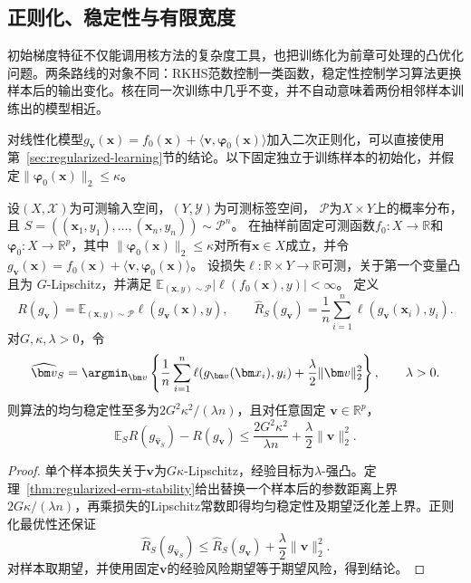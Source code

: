 \subsection{正则化、稳定性与有限宽度}

初始梯度特征不仅能调用核方法的复杂度工具，也把训练化为前章可处理的凸优化问题。两条路线的对象不同：RKHS范数控制一类函数，稳定性控制学习算法更换样本后的输出变化。核在同一次训练中几乎不变，并不自动意味着两份相邻样本训练出的模型相近。

对线性化模型$g_{\bm v}(\bm x)=f_0(\bm x)+\langle\bm v,\bm\varphi_0(\bm x)\rangle$加入二次正则化，可以直接使用第~\ref{sec:regularized-learning}节的结论。以下固定独立于训练样本的初始化，并假定$\|\bm\varphi_0(\bm x)\|_2\leq\kappa$。

\begin{theorem}[正则化固定特征模型的稳定性]
\label{thm:ntk-stability-risk}
设$(X,\mathcal X)$为可测输入空间，$(Y,\mathcal Y)$为可测标签空间，
$\mathcal P$为$X\times Y$上的概率分布，且
$S=((\bm x_1,y_1),\ldots,(\bm x_n,y_n))\sim\mathcal P^n$。
在抽样前固定可测函数$f_0:X\to\mathbb R$和
$\bm\varphi_0:X\to\mathbb R^p$，其中
$\|\bm\varphi_0(\bm x)\|_2\leq\kappa$对所有$\bm x\in X$成立，并令
$g_{\bm v}(\bm x)=f_0(\bm x)+\langle\bm v,\bm\varphi_0(\bm x)\rangle$。
设损失$\ell:\mathbb R\times Y\to\mathbb R$可测，关于第一个变量凸且为
$G$-Lipschitz，并满足
$\mathbb E_{(\bm x,y)\sim\mathcal P}|\ell(f_0(\bm x),y)|<\infty$。
定义
\[
 R(g_{\bm v})=\mathbb E_{(\bm x,y)\sim\mathcal P}
                    \ell(g_{\bm v}(\bm x),y),\qquad
 \hat R_S(g_{\bm v})=\frac1n\sum_{i=1}^n
                    \ell(g_{\bm v}(\bm x_i),y_i).
\]
对$G,\kappa,\lambda>0$，令
\[
 \widehat{\bm v}_S=\argmin_{\bm v}
 \left\{\frac1n\sum_{i=1}^n\ell(g_{\bm v}(\bm x_i),y_i)
       +\frac\lambda2\|\bm v\|_2^2\right\},\qquad\lambda>0.
\]
则算法的均匀稳定性至多为$2G^2\kappa^2/(\lambda n)$，且对任意固定
$\bm v\in\mathbb R^p$，
\[
 \mathbb E_S R(g_{\widehat{\bm v}_S})-R(g_{\bm v})
 \leq\frac{2G^2\kappa^2}{\lambda n}+\frac\lambda2\|\bm v\|_2^2.
\]
\end{theorem}
\begin{proof}
单个样本损失关于$\bm v$为$G\kappa$-Lipschitz，经验目标为$\lambda$-强凸。定理~\ref{thm:regularized-erm-stability}给出替换一个样本后的参数距离上界$2G\kappa/(\lambda n)$，再乘损失的Lipschitz常数即得均匀稳定性及期望泛化差上界。正则化最优性还保证
\[
 \hat R_S(g_{\widehat{\bm v}_S})
 \leq\hat R_S(g_{\bm v})+\frac\lambda2\|\bm v\|_2^2.
\]
对样本取期望，并使用固定$\bm v$的经验风险期望等于期望风险，得到结论。
\end{proof}

